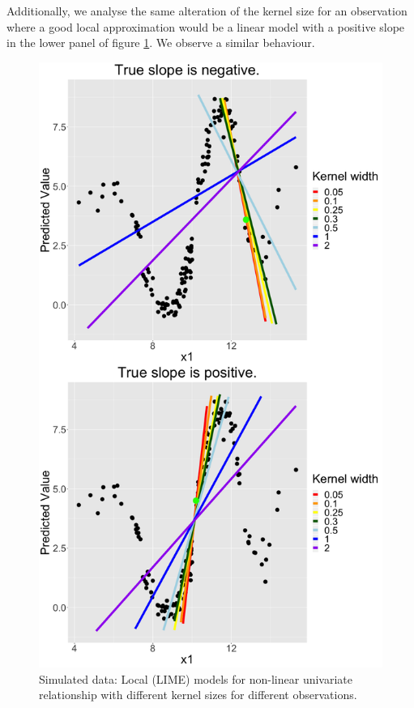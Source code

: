 \documentclass[
]{krantz}
\begin{document}
Additionally, we analyse the same alteration of the kernel size for an observation where a good local approximation would be a linear model with a positive slope in the lower panel of figure \ref{fig:lime-fig6}.
We observe a similar behaviour.

\begin{figure}

{\centering \includegraphics[width=0.99\linewidth]{images/04-09-06} 

}

\caption{Simulated data: Local (LIME) models for non-linear univariate relationship with different kernel sizes for different observations.}\label{fig:lime-fig6}
\end{figure}
\end{document}
